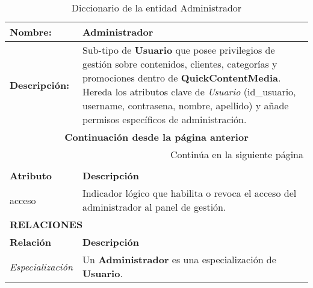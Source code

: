 \renewcommand{\arraystretch}{1.3}
\begin{longtable}{|p{3.5cm}|p{10cm}|}
\caption{Diccionario de la entidad Administrador}
\label{tab:diccionarioAdministrador} \\ 
\hline
\textbf{Nombre:} & Administrador \\
\hline
\textbf{Descripción:} & 
Sub-tipo de \textbf{Usuario} que posee privilegios de gestión sobre
contenidos, clientes, categorías y promociones dentro de
\textbf{QuickContentMedia}.  Hereda los atributos clave de
\textit{Usuario} (id\_usuario, username, contrasena, nombre,
apellido) y añade permisos específicos de administración. \\ \hline
\endfirsthead

\multicolumn{2}{c}{\textbf{Continuación desde la página anterior}} \\ 
\endhead

\hline \multicolumn{2}{r}{{Continúa en la siguiente página}} \\ 
\endfoot

\hline
\endlastfoot

\multicolumn{2}{|p{13.5cm}|}{\textbf{ATRIBUTOS}} \\ \hline
\textbf{Atributo} & \textbf{Descripción} \\ \hline
acceso      & Indicador lógico que habilita o revoca el acceso del administrador al panel de gestión. \\ \hline

\multicolumn{2}{|p{13.5cm}|}{\textbf{RELACIONES}} \\ \hline
\textbf{Relación} & \textbf{Descripción} \\ \hline
\textit{Especialización} & Un \textbf{Administrador} es una especialización de \textbf{Usuario}. \\ \hline
\end{longtable}